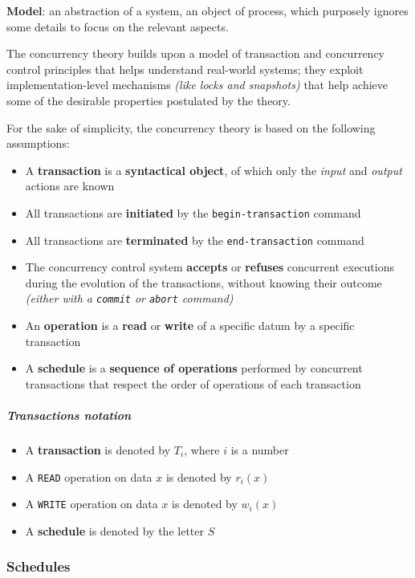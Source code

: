 \documentclass[english]{article}
\begin{document}
\textbf{Model}: an abstraction of a system, an object of process, which purposely ignores some details to focus on the relevant aspects.

The concurrency theory builds upon a model of transaction and concurrency control principles that helps understand real-world systems;
they exploit implementation-level mechanisms \textit{(like locks and snapshots)} that help achieve some of the desirable properties postulated by the theory.

For the sake of simplicity, the concurrency theory is based on the following assumptions:

\begin{itemize}
  \item A \textbf{transaction} is a \textbf{syntactical object}, of which only the \textit{input} and \textit{output} actions are known
  \item All transactions are \textbf{initiated} by the \texttt{begin-transaction} command
  \item All transactions are \textbf{terminated} by the \texttt{end-transaction} command
  \item The concurrency control system \textbf{accepts} or \textbf{refuses} concurrent executions during the evolution of the transactions, without knowing their outcome \textit{(either with a \texttt{commit} or \texttt{abort} command)}
  \item An \textbf{operation} is a \textbf{read} or \textbf{write} of a specific datum by a specific transaction
  \item A \textbf{schedule} is a \textbf{sequence of operations} performed by concurrent transactions that respect the order of operations of each transaction
\end{itemize}

\subparagraph*{Transactions notation}

\begin{itemize}
  \item A \textbf{transaction} is denoted by \(T_i\), where \(i\) is a number
  \item A \texttt{READ} operation on data \(x\) is denoted by \(r_i(x)\)
  \item A \texttt{WRITE} operation on data \(x\) is denoted by \(w_i(x)\)
  \item A \textbf{schedule} is denoted by the letter \(S\)
\end{itemize}

\subsubsection{Schedules}
\end{document}
